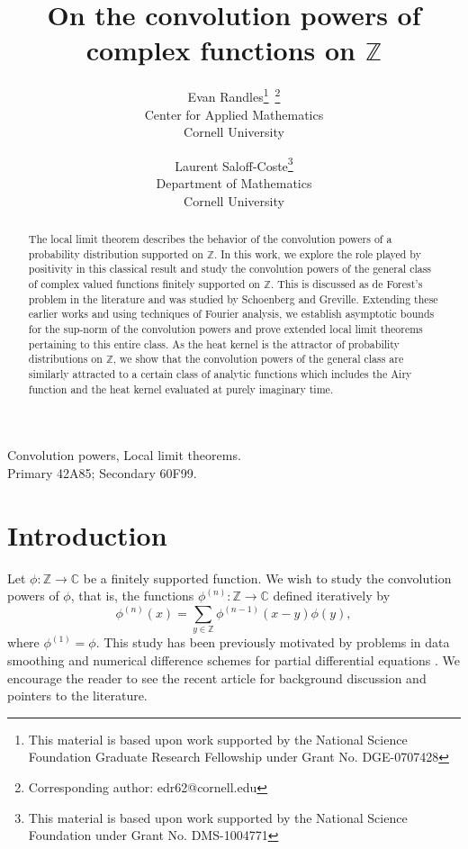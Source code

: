 \documentclass{article}
\author{Evan Randles\thanks{This material is based upon work supported by the National Science Foundation Graduate Research Fellowship under Grant No. DGE-0707428}\ \thanks{Corresponding author: edr62@cornell.edu}\\
\normalsize  Center for Applied Mathematics\\[-0.8ex]
\normalsize Cornell University\\
\and
Laurent Saloff-Coste\thanks{This material is based upon work supported by the National Science Foundation under Grant No. DMS-1004771}\\
\normalsize Department of Mathematics\\[-0.8ex]
\normalsize Cornell University\\
}
\title{On the convolution powers of complex functions on $\mathbb{Z}$}
\date{}
\theoremstyle{theorem}
\theoremstyle{remark}
\begin{document}
\maketitle

\begin{abstract} 
The local limit theorem describes the behavior of the convolution powers of a probability distribution supported on $\mathbb{Z}$. In this work, we explore the role played by positivity in this classical result and study the convolution powers of the general class of complex valued functions finitely supported on $\mathbb{Z}$. This is discussed as de Forest's problem in the literature and was studied by Schoenberg and Greville. Extending these earlier works and using techniques of Fourier analysis, we establish asymptotic bounds for the sup-norm of the convolution powers and prove extended local limit theorems pertaining to this entire class. As the heat kernel is the attractor of probability distributions on $\mathbb{Z}$, we show that the convolution powers of the general class are similarly attracted to a certain class of analytic functions which includes the Airy function and the heat kernel evaluated at purely imaginary time.
\end{abstract}


 Convolution powers, Local limit theorems.\\

 Primary 42A85; Secondary  60F99.

\section{Introduction}\label{introsec}

\noindent Let $\phi:\mathbb{Z}\rightarrow \mathbb{C}$ be a finitely supported
function. We wish to study the convolution powers of $\phi$, that is, the functions $\phi^{(n)}:\mathbb{Z}\rightarrow\mathbb{C}$
defined iteratively by 
\begin{equation*}
 \phi^{(n)}(x)=\sum_{y\in \mathbb{Z}}\phi^{(n-1)}(x-y)\phi(y),
\end{equation*}
where $\phi^{(1)}=\phi$. This study has been previously motivated by problems in data smoothing and numerical difference schemes for partial differential equations \cite{TNEG,IJS,VT1,VT2}. We encourage the reader to see the recent article \cite{DSC1} for background discussion and pointers to the literature.\\
\end{document}
